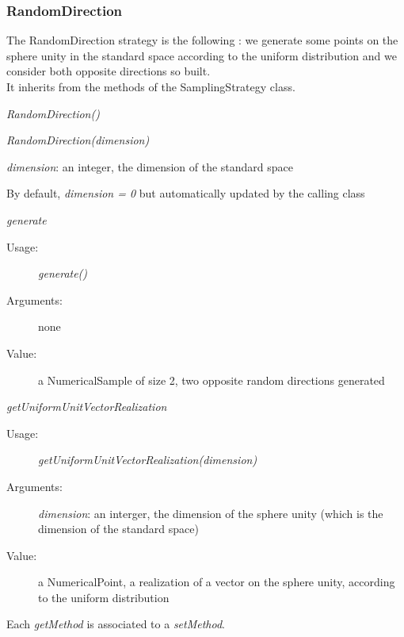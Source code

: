 \newpage
\subsubsection{RandomDirection}

The RandomDirection strategy is the following : we generate some points on the sphere unity in the standard space according to the uniform distribution and we consider both opposite directions so built.\\


It inherits from the methods of the SamplingStrategy class.

\begin{description}
\item[Usage:] \rule{0pt}{1em}
\begin{description}
\item \textit{RandomDirection()}
\item \textit{RandomDirection(dimension)}
\end{description}

\item[Arguments:]  \rule{0pt}{1em}
\begin{description}
\item \textit{dimension}: an integer, the dimension of the standard space
\item By default, \textit{dimension = 0} but automatically updated by the calling class
\end{description}
\item[Some methods :]  \rule{0pt}{1em}

\begin{description}
\item \textit{generate}
\begin{description}
\item[Usage:] \textit{generate()}
\item[Arguments:] none
\item[Value:] a NumericalSample of size 2, two opposite random directions generated
\end{description}
\bigskip
\item \textit{getUniformUnitVectorRealization}
\begin{description}
\item[Usage:] \textit{getUniformUnitVectorRealization(dimension)}
\item[Arguments:] \textit{dimension}: an interger, the dimension of the sphere unity (which is the dimension of the standard space)
\item[Value:] a NumericalPoint, a realization of a vector on the sphere unity, according to the uniform distribution
\end{description}
\end{description}

Each \textit{getMethod}  is associated to a \textit{setMethod}.

\end{description}

